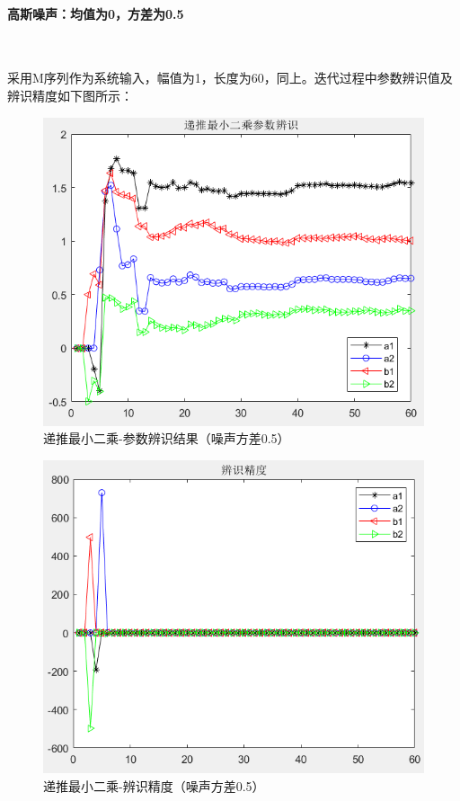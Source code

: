 \documentclass[UTF8]{article}
\begin{document}
\paragraph{高斯噪声：均值为0，方差为0.5}~{}

采用M序列作为系统输入，幅值为1，长度为60，同上。迭代过程中参数辨识值及辨识精度如下图所示：
\begin{figure}[H]
    \centering %
    \includegraphics[width=.8\textwidth]{figure/递推最小二乘-参数辨识结果（方差0.5）.png} 
    \caption{递推最小二乘-参数辨识结果（噪声方差0.5）} %
\end{figure}
\begin{figure}[H]
    \centering %
    \includegraphics[width=.8\textwidth]{figure/递推最小二乘-辨识精度（方差0.5）.png} 
    \caption{递推最小二乘-辨识精度（噪声方差0.5）} %
\end{figure}
\end{document}
